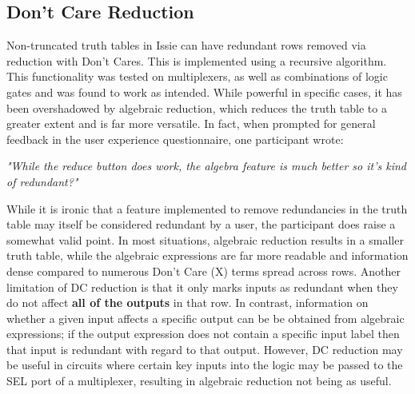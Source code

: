 \subsection{Don't Care Reduction}
Non-truncated truth tables in Issie can have redundant rows removed via reduction with Don't Cares. This is implemented using a recursive algorithm. This functionality was tested on multiplexers, as well as combinations of logic gates and was found to work as intended. While powerful in specific cases, it has been overshadowed by algebraic reduction, which reduces the truth table to a greater extent and is far more versatile. In fact, when prompted for general feedback in the user experience questionnaire, one participant wrote:
\begin{center}
    \textit{"While the reduce button does work, the algebra feature is much better so it's kind of redundant?"}
\end{center}
While it is ironic that a feature implemented to remove redundancies in the truth table may itself be considered redundant by a user, the participant does raise a somewhat valid point. In most situations, algebraic reduction results in a smaller truth table, while the algebraic expressions are far more readable and information dense compared to numerous Don't Care (X) terms spread across rows. Another limitation of DC reduction is that it only marks inputs as redundant when they do not affect \textbf{all of the outputs} in that row. In contrast,  information on whether a given input affects a specific output can be be obtained from algebraic expressions; if the output expression does not contain a specific input label then that input is redundant with regard to that output. However, DC reduction may be useful in circuits where certain key inputs into the logic may be passed to the SEL port of a multiplexer, resulting in algebraic reduction not being as useful. 

